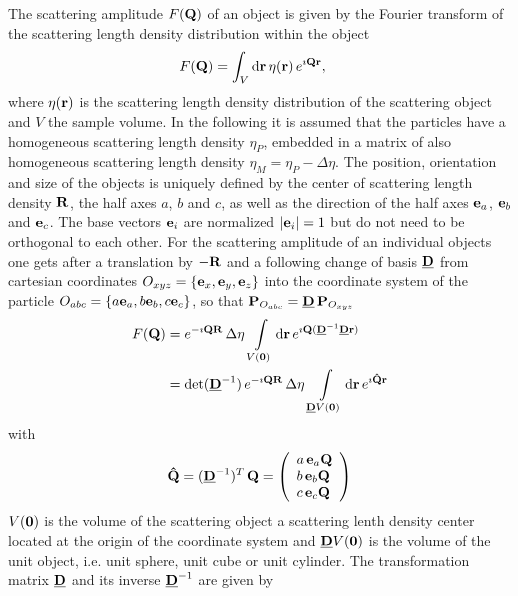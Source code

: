 The scattering amplitude $F(\B{Q})$ of an object is given by the Fourier transform of the scattering length density distribution within the object
\begin{align}
F(\B{Q}) &= \int_V \mathrm{d}\B{r}\, \eta(\B{r})\, e^{\imath \B{Qr}},
\end{align}
where $\eta(\B{r})$ is the scattering length density distribution of the scattering object and $V$ the sample volume.
In the following it is assumed that the particles have a homogeneous scattering length density
$\eta_P$, embedded in a matrix of also homogeneous scattering length density $\eta_M = \eta_P-\Delta\eta$.
The position, orientation and size of the objects is uniquely defined by the center of scattering length density $\B{R}$, the half axes $a$, $b$ and $c$, as well as the direction of the half axes $\B{e}_a$, $\B{e}_b$ and
$\B{e}_c$. The base vectors $\B{e}_i$ are normalized $\abs{\B{e}_i}=1$ but do not need to be orthogonal to each other.  For the scattering amplitude of an individual objects one gets after a translation by $-\B{R}$ and a following change of basis $\M{D}$ from cartesian coordinates
$O_{xyz} = \{\B{e}_x, \B{e}_y,\B{e}_z\}$
into the coordinate system of the particle $O_{abc}=\{a\B{e}_a, b\B{e}_b,
c\B{e}_c\}$, so that $\B{P}_{O_{abc}} = \M{D}\, \B{P}_{O_{xyz}}$
\begin{align}
F(\B{Q}) &=
e^{-\imath\B{QR}}\, \Delta\eta\,
\int\limits_{V(\B{0})} \mathrm{d}\B{r}\, e^{\imath\B{Q}(\M{D}^{-1}\M{D}\B{r})}\\
&=
\det(\M{D}^{-1})\, e^{-\imath\B{QR}}\, \Delta\eta\,
\int\limits_{\M{D} V(\B{0})} \mathrm{d}\B{r}\, e^{\imath \B{\hat{Q}}\B{r}}
\end{align}
with
\begin{align}
\displaystyle \B{\hat{Q}} = (\M{D}^{-1})^T\,\B{Q}
= \left( \begin{array}{l} a\,\B{e}_a\B{Q}\\ b\,\B{e}_b\B{Q}\\
c\, \B{e}_c\B{Q}
\end{array}\right)
\label{eq:Q:dach}
\end{align}
$V(\B{0})$ is the volume of the scattering object a scattering lenth density center located at the origin of the coordinate system and $\M{D} V(\B{0})$ is the volume of the unit object, i.e. unit sphere, unit cube or unit cylinder.
The transformation matrix $\M{D}$ and its inverse $\M{D}^{-1}$ are given by
